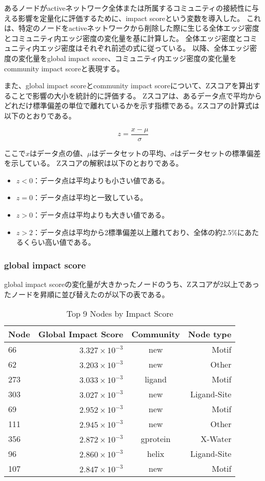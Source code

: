 あるノードがactiveネットワーク全体または所属するコミュニティの接続性に与える影響を定量化に評価するために、impact scoreという変数を導入した。
これは、特定のノードをactiveネットワークから削除した際に生じる全体エッジ密度とコミュニティ内エッジ密度の変化量を基に計算した。
全体エッジ密度とコミュニティ内エッジ密度はそれぞれ前述の式に従っている。
以降、全体エッジ密度の変化量をglobal impact score、コミュニティ内エッジ密度の変化量をcommunity impact scoreと表現する。

また、global impact scoreとcommunity impact scoreについて、Zスコアを算出することで影響の大小を統計的に評価する。
Zスコアは、あるデータ点で平均からどれだけ標準偏差の単位で離れているかを示す指標である。Zスコアの計算式は以下のとおりである。

\begin{equation}
z = \frac{x - \mu}{\sigma}
\end{equation}

ここで$x$はデータ点の値、$\mu$はデータセットの平均、$\sigma$はデータセットの標準偏差を示している。
Zスコアの解釈は以下のとおりである。
\begin{itemize}
    \item \( z < 0 \)：データ点は平均よりも小さい値である。
    \item \( z = 0 \)：データ点は平均と一致している。
    \item \( z > 0 \)：データ点は平均よりも大きい値である。
    \item \( z > 2 \)：データ点は平均から2標準偏差以上離れており、全体の約2.5\%にあたるくらい高い値である。
\end{itemize}

\subsubsection{global impact score}
global impact scoreの変化量が大きかったノードのうち、Zスコアが2以上であったノードを昇順に並び替えたのが以下の表である。
\begin{table}[ht]
    \centering
    \begin{tabular}{|l|r|c|r|}
    \hline
    \textbf{Node} & \textbf{Global Impact Score} & \textbf{Community} & \textbf{Node type}\\
    \hline
    66 & \( 3.327 \times 10^{-3} \) & new & Motif \\
    62 & \( 3.203 \times 10^{-3} \) & new & Other \\
    273 & \( 3.033 \times 10^{-3} \) & ligand & Motif \\
    303 & \( 3.027 \times 10^{-3} \) & new & Ligand-Site \\
    69 & \( 2.952 \times 10^{-3} \) & new & Motif \\
    111 & \( 2.945 \times 10^{-3} \) & new & Other \\
    356 & \( 2.872 \times 10^{-3} \) & gprotein & X-Water \\
    96 & \( 2.860 \times 10^{-3} \) & helix & Ligand-Site \\
    107 & \( 2.847 \times 10^{-3} \) & new & Motif \\
    \hline
    \end{tabular}
    \caption{Top 9 Nodes by Impact Score}
\end{table}

